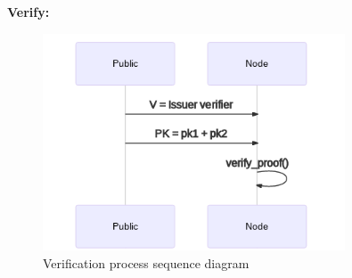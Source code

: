 \documentclass{article}
\begin{document}
\textbf{Verify:}

\begin{figure}
  \caption{Verification process sequence diagram}
  \centering
  \includegraphics[width=0.8\textwidth]{verify-seq}
\end{figure}
\end{document}
